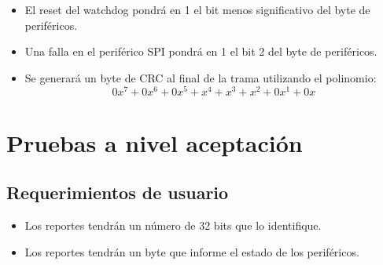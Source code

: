 \documentclass[
    11pt,
    spanish,
	a4paper
]{article}
\begin{document}
\begin{itemize}
    \item El reset del watchdog pondrá en 1 el bit menos significativo del byte de periféricos.
    \item Una falla en el periférico SPI pondrá en 1 el bit 2 del byte de periféricos.
    \item Se generará un byte de CRC al final de la trama utilizando el polinomio: 
$$ 0x^{7} + 0x^{6} + 0x^{5} + x^{4} + x^{3} + x^{2} + 0x^{1} + 0x $$
\end{itemize}

\section{Pruebas a nivel aceptación}
\label{sec:lvlaceptacion}

\subsection{Requerimientos de usuario}
\label{sub:requsuario}

\begin{itemize}
    \item Los reportes tendrán un número de 32 bits que lo identifique.
    \item Los reportes tendrán un byte que informe el estado de los periféricos.
\end{itemize}
\end{document}
